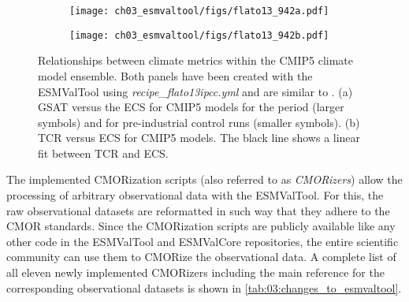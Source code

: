\begin{figure}[t]
  \centering
  \begin{subfigure}[b]{0.36\columnwidth}
    \texttt{[image: ch03\_esmvaltool/figs/flato13\_942a.pdf]}
    \caption{}
    \label{fig:03:flato13:a}
  \end{subfigure}
  \begin{subfigure}[b]{0.36\columnwidth}
    \texttt{[image: ch03\_esmvaltool/figs/flato13\_942b.pdf]}
    \caption{}
    \label{fig:03:flato13:b}
  \end{subfigure}
  \begin{subfigure}[b]{0.26\columnwidth}
  \end{subfigure}
  \caption{Relationships between climate metrics within the \acs{CMIP}5 climate
    model ensemble. Both panels have been created with the \acs{ESMValTool}
    using \emph{recipe\_flato13ipcc.yml} and are similar to
    \textcite{Flato2013}. (a) \Acf{GSAT} versus the \acf{ECS} for \acs{CMIP}5
    models for the period  (larger symbols) and for
    pre-industrial control runs (smaller symbols). (b) \acf{TCR} versus
    \acs{ECS} for \acs{CMIP}5 models. The black line shows a linear fit
    between \acs{TCR} and \acs{ECS}.}
  \label{fig:03:flato13}
\end{figure}

The implemented \ac{CMOR}ization scripts (also referred to as
\emph{\ac{CMOR}izers}) allow the processing of arbitrary observational data
with the \ac{ESMValTool}. For this, the raw observational datasets are
reformatted in such way that they adhere to the \ac{CMOR} standards. Since the
\ac{CMOR}ization scripts are publicly available like any other code in the
\ac{ESMValTool} and \ac{ESMValCore} repositories, the entire scientific
community can use them to \ac{CMOR}ize the observational data. A complete list
of all eleven newly implemented \ac{CMOR}izers including the main reference for
the corresponding observational datasets is shown in
\cref{tab:03:changes_to_esmvaltool}.
